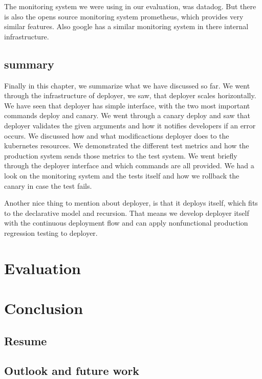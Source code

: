 The monitoring system we were using in our evaluation, was datadog. But there is also the
opens source monitoring system prometheus, which provides very similar features. Also
google has a similar monitoring system in there internal infrastructure.

\section{summary}
Finally in this chapter, we summarize what we have discussed so far. We went through the
infrastructure of deployer, we saw, that deployer scales horizontally. We have seen that
deployer has simple interface, with the two most important commands deploy and canary. We
went through a canary deploy and saw that deployer validates the given arguments and how
it notifies developers if an error occurs. We discussed how and what modificactions
deployer does to the kubernetes resources. We demonstrated the different test metrics and
how the production system sends those metrics to the test system. We went briefly through
the deployer interface and which commands are all provided. We had a look on the
monitoring system and the tests itself and how we rollback the canary in case the test
fails.

Another nice thing to mention about deployer, is that it deploys itself, which fits to the
declarative model and recursion. That means we develop deployer itself with the continuous
deployment flow and can apply nonfunctional production regression testing to deployer.

\chapter{Evaluation}

\chapter{Conclusion}
\section{Resume}
\section{Outlook and future work}


